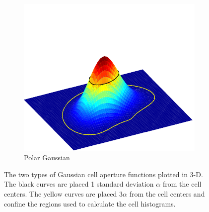 \documentclass[thesis.tex]{subfiles}
\begin{document}
\begin{figure}[p]
\begin{subfigure}[t]{0.40\textwidth}
		\includegraphics[width=\textwidth, clip=true, trim=0 0 0 90]{img/cellWindowPolar.pdf}
		\caption{Polar Gaussian}
		\label{fig:cellWindowPolar}
	\end{subfigure}
	\caption{The two types of Gaussian cell aperture functions plotted in 3-D. The black curves are placed 1 standard deviation $\alpha$ from the cell centers. The yellow curves are placed $3 \alpha$ from the cell centers and confine the regions used to calculate the cell histograms.}
	\label{fig:gridWindow}
\end{figure}
%
\end{document}
